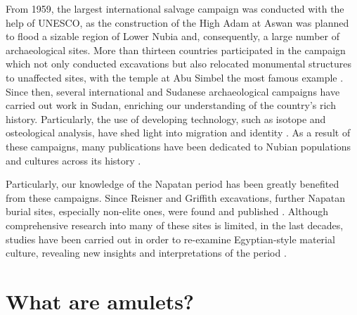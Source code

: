 From 1959, the largest international salvage campaign was conducted with the help of UNESCO, as the construction of the High Adam at Aswan was planned to flood a sizable region of Lower Nubia and, consequently, a large number of archaeological sites. More than thirteen countries participated in the campaign which not only conducted excavations but also relocated monumental structures to unaffected sites, with the temple at Abu Simbel the most famous example \parencites[p.~7-8]{raueIntroduction2019}[p.~10-11]{ahmedHistoryArchaeologicalWork2020}. Since then, several international and Sudanese archaeological campaigns have carried out work in Sudan, enriching our understanding of the country’s rich history. Particularly, the use of developing technology, such as isotope and osteological analysis, have shed light into migration and identity \parencites{buzonStrontiumIsotope87Sr2013, buzonTombosNapatanPeriod2014, schraderIlluminatingNubianDark2014, schraderIntraregional87Sr86Sr2019, gibbonMorphometricAssessmentAppendicular2016}. As a result of these campaigns, many publications have been dedicated to Nubian populations and cultures across its history \parencites{adamsNubiaCorridorAfrica1977, oconnorAncientNubiaEgypts1994, welsbyKingdomKushNapatan1996, morkotBlackPharaohsEgypts2000, smithWretchedKushEthnic2003, edwardsNubianArchaeologySudan2004, raueHandbookAncientNubia2019, emberlingOxfordHandbookAncient2020, breyerNapataUndMeroë2022}.


Particularly, our knowledge of the Napatan period has been greatly benefited from these campaigns. Since Reisner and Griffith excavations, further Napatan burial sites, especially non-elite ones, were found and published \parencites[p.~628-630]{lohwasserNapatanNecropoleisBurial2019}. Although comprehensive research into many of these sites is limited, in the last decades, studies have been carried out in order to re-examine Egyptian-style material culture, revealing new insights and interpretations of the period \parencites{lohwasserAspekteNapatanischenGesellschaft2012}{dollIdentificationSignificanceTexts1982, dollRoyalMortuaryCult2014, dollKushiteQueenIrtieru2022}\parencites{balandaProtectingMummyReinterpretation2014, balandaNapatanFuneraryAmulets2015, balandaDevelopmentRoyalFunerary2020}{petacchiLocalAspectsCult2014, petacchiBookDeadNapatan2018, petacchiNapatanTombDecorations2022}\parencites {howleyRoyalPyramidTombs2015, howleyPowerRelationsAdoption2018}{strongReexaminingTombQueen2021}.


\section{What are amulets?}


